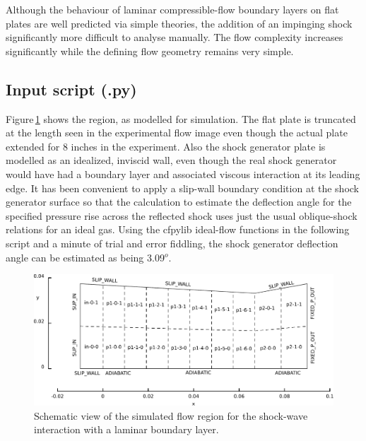 \medskip
Although the behaviour of laminar compressible-flow boundary layers on flat plates are well predicted 
via simple theories, the addition of an impinging shock significantly more difficult to analyse manually.
The flow complexity increases significantly while the defining flow geometry remains very simple. 

\bigskip
\subsection{Input script (.py)}
%
Figure\,\ref{fig:hakkinen-geometry} shows the region, as modelled for simulation.
The flat plate is truncated at the length seen in the experimental flow image even though
the actual plate extended for 8 inches in the experiment.
Also the shock generator plate is modelled as an idealized, inviscid wall, even though
the real shock generator would have had a boundary layer and associated viscous interaction
at its leading edge.
It has been convenient to apply a slip-wall boundary condition at the shock generator
surface so that the calculation to estimate the deflection angle for the specified
pressure rise across the reflected shock uses just the usual oblique-shock relations
for an ideal gas.
Using the cfpylib ideal-flow functions in the following script and a minute of trial and error fiddling, 
the shock generator deflection angle can be estimated as being 3.09$^o$.
\topbar

\bottombar

\begin{figure}[htbp]
 \centering
 \includegraphics[width=\textwidth]{../2D/hakkinen-SWLBLI/swlbli-edited.pdf}
 \caption{Schematic view of the simulated flow region for the shock-wave interaction 
          with a laminar boundary layer.}
 \label{fig:hakkinen-geometry}
\end{figure}

